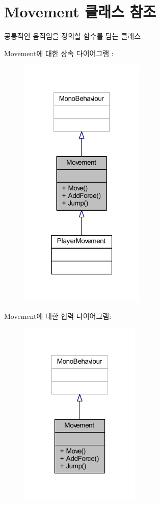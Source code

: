 \hypertarget{class_movement}{}\section{Movement 클래스 참조}
\label{class_movement}


공통적인 움직임을 정의할 함수를 담는 클래스  




Movement에 대한 상속 다이어그램 \+: 
\nopagebreak
\begin{figure}[H]
\begin{center}
\leavevmode
\includegraphics[width=169pt]{d8/d54/class_movement__inherit__graph}
\end{center}
\end{figure}


Movement에 대한 협력 다이어그램\+:
\nopagebreak
\begin{figure}[H]
\begin{center}
\leavevmode
\includegraphics[width=163pt]{d6/dad/class_movement__coll__graph}
\end{center}
\end{figure}
